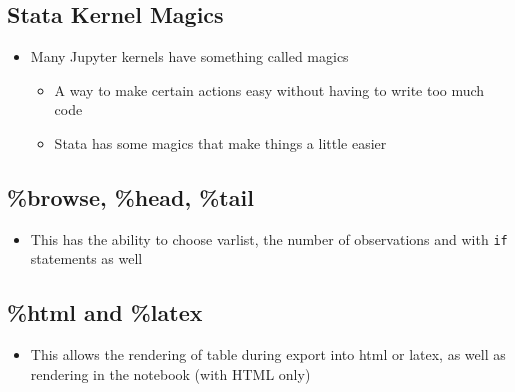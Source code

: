 \documentclass[10pt,parskip=half,
	toc=sectionentrywithdots,
	bibliography=totocnumbered,
	captions=tableheading,numbers=noendperiod]{scrartcl}
\providecommand{\tightlist}{%
  \setlength{\itemsep}{0pt}\setlength{\parskip}{0pt}}
\begin{document}
\hypertarget{stata-kernel-magics}{%
\subsection{Stata Kernel Magics}\label{stata-kernel-magics}}

\begin{itemize}
\tightlist
\item
  Many Jupyter kernels have something called magics

  \begin{itemize}
  \tightlist
  \item
    A way to make certain actions easy without having to write too much
    code
  \item
    Stata has some magics that make things a little easier
  \end{itemize}
\end{itemize}

\hypertarget{browse-head-tail}{%
\subsection{\%browse, \%head, \%tail}\label{browse-head-tail}}

\begin{itemize}
\tightlist
\item
  This has the ability to choose varlist, the number of observations and
  with \texttt{if} statements as well
\end{itemize}

\hypertarget{html-and-latex}{%
\subsection{\%html and \%latex}\label{html-and-latex}}

\begin{itemize}
\tightlist
\item
  This allows the rendering of table during export into html or latex,
  as well as rendering in the notebook (with HTML only)
\end{itemize}
\end{document}
